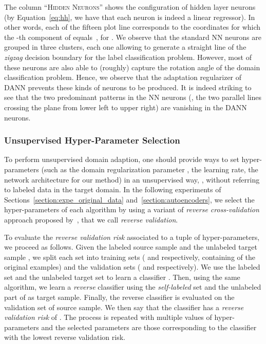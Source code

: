 \documentclass[twoside,11pt]{article}
\begin{document}
The column ``\textsc{Hidden Neurons}'' shows the configuration of hidden layer neurons 
(by Equation~\ref{eq:hh}, we have that each neuron is indeed a linear regressor). In other words, each of the fifteen plot line corresponds to the coordinates  for which the -th component of   equals~, for . 
We observe that the standard NN neurons are grouped in three clusters, each one allowing to generate a straight line of the \emph{zigzag} decision boundary for the label classification problem. However, most of these neurons are also able to (roughly) capture the rotation angle of the domain classification problem. Hence, we observe that the adaptation regularizer of DANN prevents these kinds of neurons to be produced. It is indeed striking to see that the two predominant patterns in the NN neurons (\ie, the two parallel lines crossing the plane from lower left to upper right) are vanishing in the DANN neurons.

\subsubsection{Unsupervised Hyper-Parameter Selection}
\label{section:shallow_model_selection}

To perform unsupervised domain adaption, one should provide ways to set hyper-parameters (such as the domain regularization parameter , the learning rate, the network architecture for our method) in an unsupervised way, \ie, without referring to labeled data in the target domain. 
In the following experiments of Sections~\ref{section:expe_original_data} and~\ref{section:autoencoders},
we select the hyper-parameters of each algorithm by using a variant of \emph{reverse cross-validation} approach proposed by~\citet{zhong2010cross}, that we call \emph{reverse validation}.

To evaluate the \emph{reverse validation risk} associated to a tuple of hyper-parameters, we proceed as follows.
Given the labeled source sample  and the  unlabeled target sample , we split each set into training sets ( and  respectively, containing  of the original examples) and the validation sets ( and  respectively). 
We use the labeled  set  and the unlabeled target set  to learn a classifier . Then, using the same algorithm, we learn a \emph{reverse} classifier  using the \emph{self-labeled} set  and the unlabeled part of  as target sample. Finally, the reverse classifier  is evaluated on the validation set  of source sample. 
We then say that the classifier  has a \emph{reverse validation risk} of
. The process is repeated with multiple values of hyper-parameters and
the selected parameters are those corresponding to the classifier
with the lowest reverse validation risk. 
\end{document}

